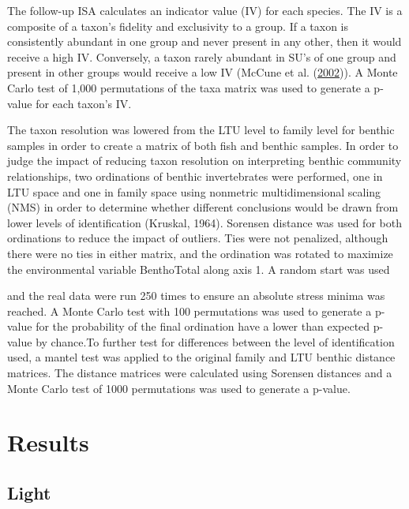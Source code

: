 \documentclass[double,12pt]{beavtex}
\begin{document}
  The follow-up ISA calculates an indicator value (IV) for each species.
  The IV is a composite of a taxon's fidelity and exclusivity to a group.
  If a taxon is consistently abundant in one group and never present in
  any other, then it would receive a high IV. Conversely, a taxon rarely
  abundant in SU's of one group and present in other groups would receive
  a low IV (McCune et al. (\protect\hyperlink{ref-McCune2002}{2002})). A
  Monte Carlo test of 1,000 permutations of the taxa matrix was used to
  generate a p-value for each taxon's IV.
  
  The taxon resolution was lowered from the LTU level to family level for
  benthic samples in order to create a matrix of both fish and benthic
  samples. In order to judge the impact of reducing taxon resolution on
  interpreting benthic community relationships, two ordinations of benthic
  invertebrates were performed, one in LTU space and one in family space
  using nonmetric multidimensional scaling (NMS) in order to determine
  whether different conclusions would be drawn from lower levels of
  identification (Kruskal, 1964). Sorensen distance was used for both
  ordinations to reduce the impact of outliers. Ties were not penalized,
  although there were no ties in either matrix, and the ordination was
  rotated to maximize the environmental variable BenthoTotal along axis 1.
  A random start was used
  
  and the real data were run 250 times to ensure an absolute stress minima
  was reached. A Monte Carlo test with 100 permutations was used to
  generate a p-value for the probability of the final ordination have a
  lower than expected p-value by chance.To further test for differences
  between the level of identification used, a mantel test was applied to
  the original family and LTU benthic distance matrices. The distance
  matrices were calculated using Sorensen distances and a Monte Carlo test
  of 1000 permutations was used to generate a p-value.
  
  \chapter*{Results}\label{results}
  
  \section*{Light}\label{light-1}
  
\end{document}
